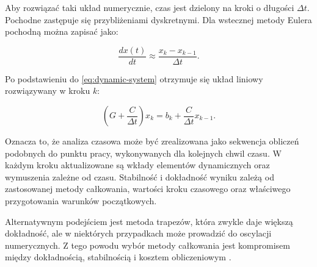 Aby rozwiązać taki układ numerycznie, czas jest dzielony na kroki o długości \(\Delta t\). Pochodne zastępuje się przybliżeniami dyskretnymi. Dla wstecznej metody Eulera pochodną można zapisać jako:

\begin{equation}
\label{eq:backward-euler}
\frac{dx(t)}{dt} \approx \frac{x_k - x_{k-1}}{\Delta t}.
\end{equation}

Po podstawieniu do \cref{eq:dynamic-system} otrzymuje się układ liniowy rozwiązywany w kroku \(k\):

\begin{equation}
\label{eq:dynamic-step}
\left(G + \frac{C}{\Delta t}\right)x_k =
b_k + \frac{C}{\Delta t}x_{k-1}.
\end{equation}

Oznacza to, że analiza czasowa może być zrealizowana jako sekwencja obliczeń podobnych do punktu pracy, wykonywanych dla kolejnych chwil czasu. W każdym kroku aktualizowane są wkłady elementów dynamicznych oraz wymuszenia zależne od czasu. Stabilność i dokładność wyniku zależą od zastosowanej metody całkowania, wartości kroku czasowego oraz właściwego przygotowania warunków początkowych.

Alternatywnym podejściem jest metoda trapezów, która zwykle daje większą dokładność, ale w niektórych przypadkach może prowadzić do oscylacji numerycznych. Z tego powodu wybór metody całkowania jest kompromisem między dokładnością, stabilnością i kosztem obliczeniowym \cite{nagel1975spice2,kundert1995designer}.
